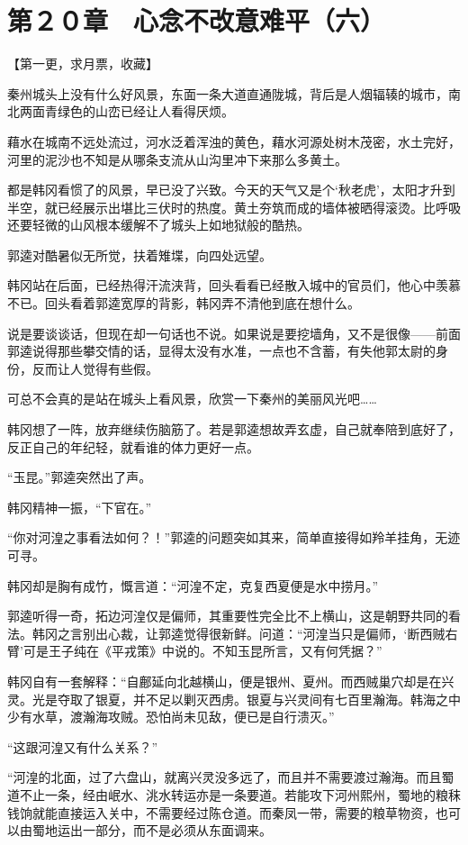 \section{第２０章　心念不改意难平（六） }

【第一更，求月票，收藏】

秦州城头上没有什么好风景，东面一条大道直通陇城，背后是人烟辐辏的城市，南北两面青绿色的山峦已经让人看得厌烦。

藉水在城南不远处流过，河水泛着浑浊的黄色，藉水河源处树木茂密，水土完好，河里的泥沙也不知是从哪条支流从山沟里冲下来那么多黄土。

都是韩冈看惯了的风景，早已没了兴致。今天的天气又是个‘秋老虎’，太阳才升到半空，就已经展示出堪比三伏时的热度。黄土夯筑而成的墙体被晒得滚烫。比呼吸还要轻微的山风根本缓解不了城头上如地狱般的酷热。

郭逵对酷暑似无所觉，扶着雉堞，向四处远望。

韩冈站在后面，已经热得汗流浃背，回头看看已经散入城中的官员们，他心中羡慕不已。回头看着郭逵宽厚的背影，韩冈弄不清他到底在想什么。

说是要谈谈话，但现在却一句话也不说。如果说是要挖墙角，又不是很像——前面郭逵说得那些攀交情的话，显得太没有水准，一点也不含蓄，有失他郭太尉的身份，反而让人觉得有些假。

可总不会真的是站在城头上看风景，欣赏一下秦州的美丽风光吧……

韩冈想了一阵，放弃继续伤脑筋了。若是郭逵想故弄玄虚，自己就奉陪到底好了，反正自己的年纪轻，就看谁的体力更好一点。

“玉昆。”郭逵突然出了声。

韩冈精神一振，“下官在。”

“你对河湟之事看法如何？！”郭逵的问题突如其来，简单直接得如羚羊挂角，无迹可寻。

韩冈却是胸有成竹，慨言道：“河湟不定，克复西夏便是水中捞月。”

郭逵听得一奇，拓边河湟仅是偏师，其重要性完全比不上横山，这是朝野共同的看法。韩冈之言别出心裁，让郭逵觉得很新鲜。问道：“河湟当只是偏师，‘断西贼右臂’可是王子纯在《平戎策》中说的。不知玉昆所言，又有何凭据？”

韩冈自有一套解释：“自鄜延向北越横山，便是银州、夏州。而西贼巢穴却是在兴灵。光是夺取了银夏，并不足以剿灭西虏。银夏与兴灵间有七百里瀚海。韩海之中少有水草，渡瀚海攻贼。恐怕尚未见敌，便已是自行溃灭。”

“这跟河湟又有什么关系？”

“河湟的北面，过了六盘山，就离兴灵没多远了，而且并不需要渡过瀚海。而且蜀道不止一条，经由岷水、洮水转运亦是一条要道。若能攻下河州熙州，蜀地的粮秣钱饷就能直接运入关中，不需要经过陈仓道。而秦凤一带，需要的粮草物资，也可以由蜀地运出一部分，而不是必须从东面调来。

